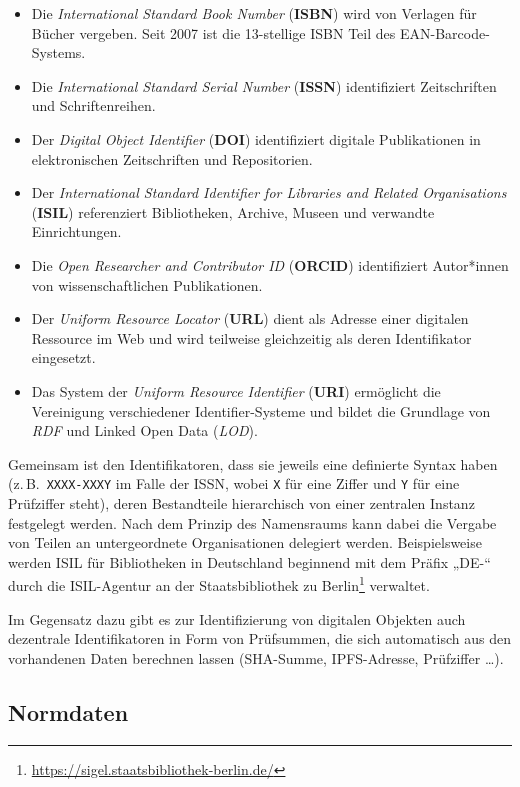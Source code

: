 \documentclass[
  11pt,
  letterpaper,
  DIV=11,
  twoside]{scrreprt}
\DeclareRobustCommand{\href}[2]{#2\footnote{\url{#1}}}
\begin{document}
\begin{itemize}
\item
  Die \emph{International Standard Book Number} (\textbf{ISBN}) wird von
  Verlagen für Bücher vergeben. Seit 2007 ist die 13-stellige ISBN Teil
  des EAN-Barcode-Systems.
\item
  Die \emph{International Standard Serial Number} (\textbf{ISSN})
  identifiziert Zeitschriften und Schriftenreihen.
\item
  Der \emph{Digital Object Identifier} (\textbf{DOI}) identifiziert
  digitale Publikationen in elektronischen Zeitschriften und
  Repositorien.
\item
  Der \emph{International Standard Identifier for Libraries and Related
  Organisations} (\textbf{ISIL}) referenziert Bibliotheken, Archive,
  Museen und verwandte Einrichtungen.
\item
  Die \emph{Open Researcher and Contributor ID} (\textbf{ORCID})
  identifiziert Autor*innen von wissenschaftlichen Publikationen.
\item
  Der \emph{Uniform Resource Locator} (\textbf{URL}) dient als Adresse
  einer digitalen Ressource im Web und wird teilweise gleichzeitig als
  deren Identifikator eingesetzt.
\item
  Das System der \emph{Uniform Resource Identifier} (\textbf{URI})
  ermöglicht die Vereinigung verschiedener Identifier-Systeme und bildet
  die Grundlage von \emph{RDF} und Linked Open Data (\emph{LOD}).
\end{itemize}

Gemeinsam ist den Identifikatoren, dass sie jeweils eine definierte
Syntax haben (z.\,B.~\texttt{XXXX-XXXY} im Falle der ISSN, wobei
\texttt{X} für eine Ziffer und \texttt{Y} für eine Prüfziffer steht),
deren Bestandteile hierarchisch von einer zentralen Instanz festgelegt
werden. Nach dem Prinzip des Namensraums kann dabei die Vergabe von
Teilen an untergeordnete Organisationen delegiert werden. Beispielsweise
werden ISIL für Bibliotheken in Deutschland beginnend mit dem Präfix
„DE-`` durch die
\href{https://sigel.staatsbibliothek-berlin.de/}{ISIL-Agentur an der
Staatsbibliothek zu Berlin} verwaltet.

Im Gegensatz dazu gibt es zur Identifizierung von digitalen Objekten
auch dezentrale Identifikatoren in Form von Prüfsummen, die sich
automatisch aus den vorhandenen Daten berechnen lassen (SHA-Summe,
IPFS-Adresse, Prüfziffer \ldots).

\subsection{Normdaten}\label{normdaten}
\end{document}
